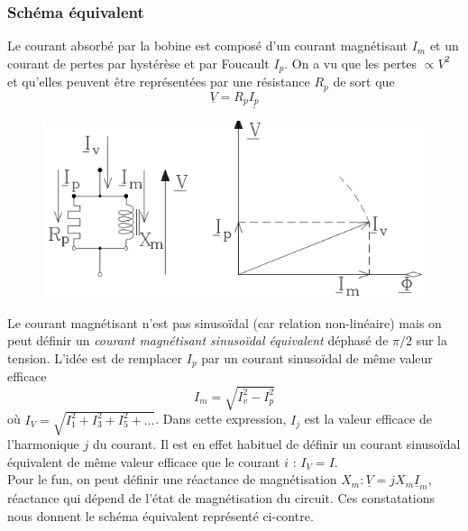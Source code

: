 		\subsubsection{Schéma équivalent}
		Le courant absorbé par la bobine est composé d'un courant 
		magnétisant $I_m$ et un courant de pertes par hystérèse et par 
		Foucault $I_p$. On a vu que les pertes $\propto V^2$ et qu'elles 
		peuvent être représentées par une résistance $R_p$ de sort que 
		\begin{equation}
		\underline{V} = R_p\underline{I_p}
		\end{equation}
		\newpage
		\begin{figure}
		\includegraphics[scale=0.3]{ch3/image6.png}
		\end{figure}
		Le courant magnétisant n'est pas sinusoïdal (car relation non-linéaire)
		mais on peut définir 
		un \textit{courant magnétisant sinusoïdal équivalent} déphasé de 
		$\pi/2$ sur la tension. L'idée est de remplacer $I_p$ par un courant 
		sinusoïdal de même valeur efficace
		\begin{equation}
		I_m= \sqrt{I_v^2-I_p^2}
		\end{equation}
		où $I_V = \sqrt{I_1^2+I_3^2+I_5^2+\dots}$. Dans cette expression, 
		$I_j$ est la valeur efficace de l'harmonique $j$ du courant. Il est 
		en effet habituel de définir un courant sinusoïdal équivalent de  
		même valeur efficace que le courant $i$ : $I_V = I$.\\
		Pour le fun, on peut définir une réactance de magnétisation $X_m : 
		\underline{V} = jX_m\underline{I}_m$, réactance qui dépend de l'état 
		de magnétisation du circuit. Ces constatations nous donnent le 
		schéma équivalent représenté ci-contre.
		
